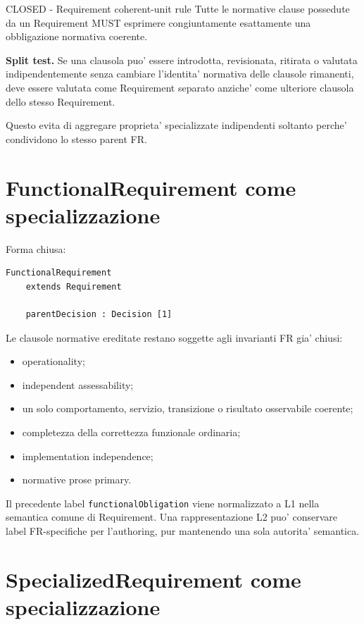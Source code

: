 \documentclass[11pt,a4paper]{article}
\begin{document}
\begin{resultbox}{CLOSED - Requirement coherent-unit rule}
Tutte le normative clause possedute da un Requirement MUST esprimere congiuntamente esattamente una obbligazione normativa coerente.
\end{resultbox}

\textbf{Split test.} Se una clausola puo' essere introdotta, revisionata, ritirata o valutata indipendentemente senza cambiare l'identita' normativa delle clausole rimanenti, deve essere valutata come Requirement separato anziche' come ulteriore clausola dello stesso Requirement.

Questo evita di aggregare proprieta' specializzate indipendenti soltanto perche' condividono lo stesso parent FR.

\section{FunctionalRequirement come specializzazione}

Forma chiusa:

\begin{lstlisting}
FunctionalRequirement
    extends Requirement

    parentDecision : Decision [1]
\end{lstlisting}

Le clausole normative ereditate restano soggette agli invarianti FR gia' chiusi:
\begin{itemize}
  \item operationality;
  \item independent assessability;
  \item un solo comportamento, servizio, transizione o risultato osservabile coerente;
  \item completezza della correttezza funzionale ordinaria;
  \item implementation independence;
  \item normative prose primary.
\end{itemize}

Il precedente label \texttt{functionalObligation} viene normalizzato a L1 nella semantica comune di Requirement. Una rappresentazione L2 puo' conservare label FR-specifiche per l'authoring, pur mantenendo una sola autorita' semantica.

\section{SpecializedRequirement come specializzazione}
\end{document}
